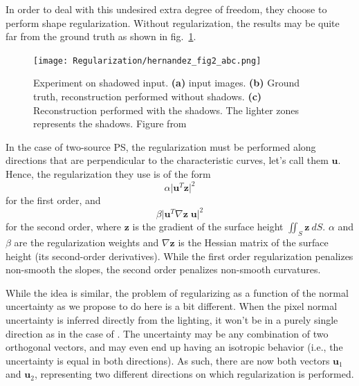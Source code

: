 In order to deal with this undesired extra degree of freedom, they choose to perform shape regularization. Without regularization, the results may be quite far from the ground truth as shown in fig.~\ref{fig:reg-her2}.

\begin{figure}
\centering
\texttt{[image: Regularization/hernandez\_fig2\_abc.png]}
\caption{Experiment on shadowed input. \textbf{(a)} input images. \textbf{(b)} Ground truth, reconstruction performed without shadows. \textbf{(c)} Reconstruction performed with the shadows. The lighter zones represents the shadows. Figure from~\cite{hernandez-pami-11}}
\label{fig:reg-her2}
\end{figure}

In the case of two-source PS, the regularization must be performed along directions that are perpendicular to the characteristic curves, let's call them $\mathbf{u}$. Hence, the regularization they use is of the form
\begin{equation}
\alpha \lvert \mathbf{u}^T \mathbf{z} \rvert ^2
\end{equation}
for the first order, and 
\begin{equation}
\beta \lvert \mathbf{u}^T \nabla \mathbf{z} \; \mathbf{u} \rvert ^2
\end{equation}
for the second order, where $\mathbf{z}$ is the gradient of the surface height $\iint_S\mathbf{z} \: dS$. $\alpha$ and $\beta$ are the regularization weights and $\nabla \mathbf{z}$ is the Hessian matrix of the surface height (its second-order derivatives). While the first order regularization penalizes non-smooth the slopes, the second order penalizes non-smooth curvatures.

While the idea is similar, the problem of regularizing as a function of the normal uncertainty as we propose to do here is a bit different. When the pixel normal uncertainty is inferred directly from the lighting, it won't be in a purely single direction as in the case of \cite{hernandez-pami-11}. The uncertainty may be any combination of two orthogonal vectors, and may even end up having an isotropic behavior (i.e., the uncertainty is equal in both directions). As such, there are now both vectors $\mathbf{u}_1$ and $\mathbf{u}_2$, representing two different directions on which regularization is performed.

